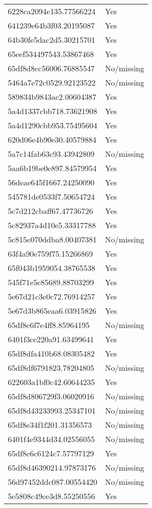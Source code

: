 \begin{tabular}{ll}
6228ca2094e135.77566224 & Yes \\
641239e64b3f03.20195087 & Yes \\
64b30fe5dac2d5.30215701 & Yes \\
65eef534497543.53867468 & Yes \\
65df8d8cc56006.76885547 & No/missing \\
5464a7e72c0529.92123522 & No/missing \\
589834b9843ac2.00604387 & Yes \\
5a4d1337cbb718.73621908 & Yes \\
5a4d1290cbb953.75495604 & Yes \\
620d06e4b90e30.40579884 & Yes \\
5a7c14fab63c93.43942809 & No/missing \\
5aa6b19be0e897.84579954 & Yes \\
56deae645f1667.24250090 & Yes \\
545781de0533f7.50654724 & Yes \\
5c7d212cbaff67.47736726 & Yes \\
5c82937a4d10e5.33317788 & Yes \\
5c815e070ddba8.00407381 & No/missing \\
63f4a90e759f75.15266869 & Yes \\
65f043b1959054.38765538 & Yes \\
545f71e5c85689.88703299 & Yes \\
5e67d21c3e0c72.76914257 & Yes \\
5e67d3b865eaa6.03915826 & Yes \\
65df8e6f7e4ff8.85964195 & No/missing \\
6401f3ce220a91.63499641 & Yes \\
65df8dfa410b68.08305482 & Yes \\
65df8df6791823.78204805 & No/missing \\
622603a1bf0c42.60644235 & Yes \\
65df8d806729f3.06020916 & No/missing \\
65df8d43233993.25347101 & No/missing \\
65df8e34f1f201.31356573 & No/missing \\
6401f4e9344d34.02556055 & No/missing \\
65df8e6c6124c7.57797129 & Yes \\
65df8d46390214.97873176 & No/missing \\
56d97452ddc087.00554420 & No/missing \\
5e5808c49ce3d8.55250556 & Yes \\

\end{tabular}
